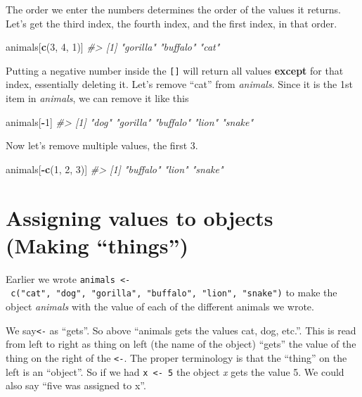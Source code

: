\documentclass[
  12pt,
]{book}
\newenvironment{Shaded}{\begin{snugshade}}{\end{snugshade}}
\newcommand{\CommentTok}[1]{\textcolor[rgb]{0.37,0.37,0.37}{\textit{#1}}}
\newcommand{\DecValTok}[1]{\textcolor[rgb]{0.06,0.06,0.06}{#1}}
\newcommand{\KeywordTok}[1]{\textcolor[rgb]{0.27,0.27,0.27}{\textbf{#1}}}
\newcommand{\NormalTok}[1]{#1}
\newcommand{\OperatorTok}[1]{\textcolor[rgb]{0.43,0.43,0.43}{\textbf{#1}}}
\begin{document}
The order we enter the numbers determines the order of the values it returns. Let's get the third index, the fourth index, and the first index, in that order.

\begin{Shaded}
\begin{Highlighting}[]
\NormalTok{animals[}\KeywordTok{c}\NormalTok{(}\DecValTok{3}\NormalTok{, }\DecValTok{4}\NormalTok{, }\DecValTok{1}\NormalTok{)]}
\CommentTok{\#\textgreater{} [1] "gorilla" "buffalo" "cat"}
\end{Highlighting}
\end{Shaded}

Putting a negative number inside the \texttt{{[}{]}} will return all values \textbf{except} for that index, essentially deleting it. Let's remove ``cat'' from \emph{animals}. Since it is the 1st item in \emph{animals}, we can remove it like this

\begin{Shaded}
\begin{Highlighting}[]
\NormalTok{animals[}\OperatorTok{{-}}\DecValTok{1}\NormalTok{]}
\CommentTok{\#\textgreater{} [1] "dog"     "gorilla" "buffalo" "lion"    "snake"}
\end{Highlighting}
\end{Shaded}

Now let's remove multiple values, the first 3.

\begin{Shaded}
\begin{Highlighting}[]
\NormalTok{animals[}\OperatorTok{{-}}\KeywordTok{c}\NormalTok{(}\DecValTok{1}\NormalTok{, }\DecValTok{2}\NormalTok{, }\DecValTok{3}\NormalTok{)]}
\CommentTok{\#\textgreater{} [1] "buffalo" "lion"    "snake"}
\end{Highlighting}
\end{Shaded}

\hypertarget{assignment}{%
\section{Assigning values to objects (Making ``things'')}\label{assignment}}

Earlier we wrote \texttt{animals\ \textless{}-\ c("cat",\ "dog",\ "gorilla",\ "buffalo",\ "lion",\ "snake")} to make the object \emph{animals} with the value of each of the different animals we wrote.

We say\texttt{\textless{}-} as ``gets''. So above ``animals gets the values cat, dog, etc.''. This is read from left to right as thing on left (the name of the object) ``gets'' the value of the thing on the right of the \texttt{\textless{}-}. The proper terminology is that the ``thing'' on the left is an ``object''. So if we had \texttt{x\ \textless{}-\ 5} the object \emph{x} gets the value 5. We could also say ``five was assigned to x''.
\end{document}
